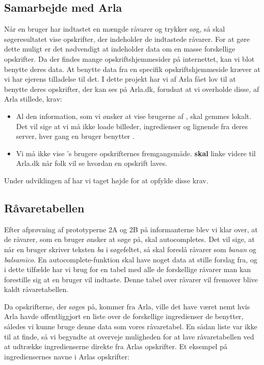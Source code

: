 \subsection{Samarbejde med Arla}
Når en bruger har indtastet en mængde råvarer og trykker søg, så skal søgeresultatet vise opskrifter, der indeholder de indtastede råvarer. For at gøre dette muligt er det nødvendigt at \Foodl{} indeholder data om en masse forskellige opskrifter. Da der findes mange opskriftshjemmesider på internettet, kan vi blot benytte deres data. At benytte data fra en specifik opskriftshjemmeside kræver at vi har ejerens tilladelse til det. I dette projekt har vi af Arla fået lov til at benytte deres opskrifter, der kan ses på Arla.dk, forudsat at vi overholde disse, af Arla stillede, krav:
\begin{itemize}
\item Al den information, som vi ønsker at vise brugerne af \Foodl, skal gemmes lokalt. Det vil sige at vi må ikke loade billeder, ingredienser og lignende fra deres server, hver gang en bruger benytter \Foodl.
\item Vi må ikke vise \Foodl{}'s brugere opskrifternes fremgangsmåde. \Foodl \textbf{skal} linke videre til Arla.dk når folk vil se hvordan en opskrift laves.
\end{itemize}
Under udviklingen af \Foodl{} har vi taget højde for at opfylde disse krav.

\subsection{Råvaretabellen}
Efter afprøvning af prototyperne 2A og 2B på informanterne blev vi klar over, at de råvarer, som en bruger ønsker at søge på, skal autocompletes. Det vil sige, at når en bruger skriver teksten \textit{ba} i søgefeltet, så skal \Foodl{} foreslå råvarer som \fx \textit{banan} og \textit{balsamico}.
En autocomplete-funktion skal have noget data at stille forslag fra, og i dette tilfælde har vi brug for en tabel med alle de forskellige råvarer man kan forestille sig at en bruger vil indtaste. Denne tabel over råvarer vil fremover blive kaldt råvaretabellen.

Da opskrifterne, der søges på, kommer fra Arla, ville det have været nemt hvis Arla havde offentliggjort en liste over de forskellige ingredienser de benytter, således vi kunne bruge denne data som vores råvaretabel. En sådan liste var ikke til at finde, så vi begyndte at overveje muligheden for at lave råvaretabellen ved at udtrække ingredienserne direkte fra Arlas opskrifter. Et eksempel på ingrediensernes navne i Arlas opskrifter:

